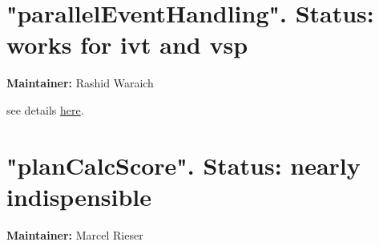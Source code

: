 









\section{"parallelEventHandling". Status: works for ivt and vsp}

\textbf{Maintainer:} Rashid Waraich

see details \href{http://matsim.org/node/238}{here}.



\vfill\eject
\section{"planCalcScore". Status: nearly indispensible}

\textbf{Maintainer:} Marcel Rieser

